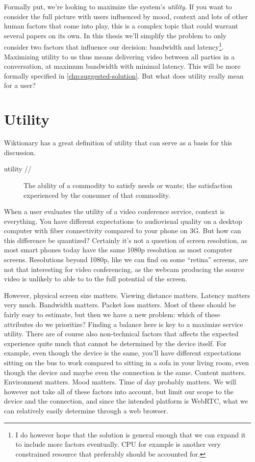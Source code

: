 Formally put, we're looking to maximize the system's \emph{utility}. If you want to consider the full picture with users influenced by mood, context and lots of other human factors that come into play, this is a complex topic that could warrant several papers on its own. In this thesis we'll simplify the problem to only consider two factors that influence our decision: bandwidth and latency\footnote{I do however hope that the solution is general enough that we can expand it to include more factors eventually. CPU for example is another very constrained resource that preferably should be accounted for.}. Maximizing utility to us thus means delivering video between all parties in a conversation, at maximum bandwidth with minimal latency. This will be more formally specified in \autoref{chp:suggested-solution}. But what does utility really mean for a user?


\section{Utility}

Wiktionary \cite{wiki-utility} has a great definition of utility that can serve as a basis for this discussion.

\begin{description}
    \item[utility //]  The ability of a commodity to satisfy needs or wants; the satisfaction experienced by the consumer of that commodity.
\end{description}

When a user evaluates the utility of a video conference service, context is everything. You have different expectations to audiovisual quality on a desktop computer with fiber connectivity compared to your phone on 3G. But how can this difference be quantized? Certainly it's not a question of screen resolution, as most smart phones today have the same 1080p resolution as most computer screens. Resolutions beyond 1080p, like we can find on some ``retina'' screens, are not that interesting for video conferencing, as the webcam producing the source video is unlikely to able to to the full potential of the screen.

However, physical screen size matters. Viewing distance matters. Latency matters very much. Bandwidth matters. Packet loss matters. Most of these should be fairly easy to estimate, but then we have a new problem: which of these attributes do we prioritize? Finding a balance here is key to a maximize service utility. There are of course also non-technical factors that affects the expected experience quite much that cannot be determined by the device itself. For example, even though the device is the same, you'll have different expectations sitting on the bus to work compared to sitting in a sofa in your living room, even though the device and maybe even the connection is the same. Content matters. Environment matters. Mood matters. Time of day probably matters. We will however not take all of these factors into account, but limit our scope to the device and the connection, and since the intended platform is WebRTC, what we can relatively easily determine through a web browser.

